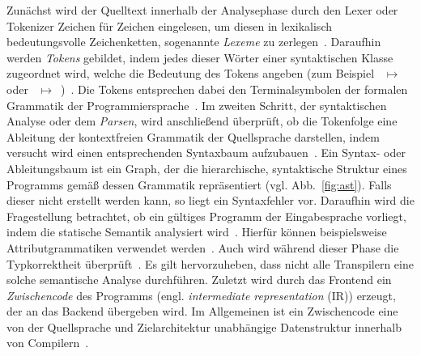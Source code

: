 Zunächst wird der Quelltext innerhalb der Analysephase durch den Lexer oder Tokenizer Zeichen für Zeichen eingelesen, um diesen in lexikalisch bedeutungsvolle Zeichenketten, sogenannte \emph{Lexeme} zu zerlegen~\autocite[43]{AHO:COMPILERS}. Daraufhin werden \emph{Tokens} gebildet, indem jedes dieser Wörter einer syntaktischen Klasse zugeordnet wird, welche die Bedeutung des Tokens angeben (zum Beispiel ~$\mapsto$~ oder \code{!=}~$\mapsto$~)~\autocite[26]{TORCZON:2007}. Die Tokens entsprechen dabei den Terminalsymbolen der formalen Grammatik der Programmiersprache~\autocite[43]{AHO:COMPILERS}.
Im zweiten Schritt, der syntaktischen Analyse oder dem \emph{Parsen}, wird anschließend überprüft, ob die Tokenfolge eine Ableitung der kontextfreien Grammatik der Quellsprache darstellen, indem versucht wird einen entsprechenden Syntaxbaum aufzubauen~\autocite{SCHOEPP:COMPILER}. Ein Syntax- oder Ableitungsbaum ist ein Graph, der die hierarchische, syntaktische Struktur eines Programms gemäß dessen Grammatik repräsentiert (vgl. Abb.~\ref{fig:ast}).
Falls dieser nicht erstellt werden kann, so liegt ein Syntaxfehler vor.
Daraufhin wird die Fragestellung betrachtet, ob ein gültiges Programm der Eingabesprache vorliegt, indem die statische Semantik analysiert wird~\autocite[8]{AHO:COMPILERS}. Hierfür können beispielsweise Attributgrammatiken verwendet werden~\autocite[161]{TORCZON:2007}.
Auch wird während dieser Phase die Typkorrektheit überprüft~\autocite{SCHOEPP:COMPILER}. Es gilt hervorzuheben, dass nicht alle Transpilern eine solche semantische Analyse durchführen.
Zuletzt wird durch das Frontend ein \emph{Zwischencode} des Programms (engl. \textit{intermediate representation} (IR)) erzeugt, der an das Backend übergeben wird. Im Allgemeinen ist ein Zwischencode eine von der Quellsprache und Zielarchitektur unabhängige Datenstruktur innerhalb von Compilern~\autocite[6]{TORCZON:2007}.


